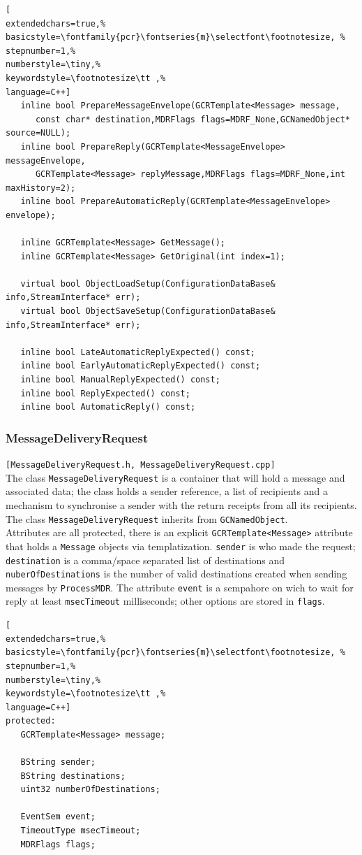 \begin{lstlisting}[
extendedchars=true,%
basicstyle=\fontfamily{pcr}\fontseries{m}\selectfont\footnotesize, %
stepnumber=1,%
numberstyle=\tiny,%
keywordstyle=\footnotesize\tt ,%
language=C++]
   inline bool PrepareMessageEnvelope(GCRTemplate<Message> message,
      const char* destination,MDRFlags flags=MDRF_None,GCNamedObject* source=NULL);
   inline bool PrepareReply(GCRTemplate<MessageEnvelope> messageEnvelope,
      GCRTemplate<Message> replyMessage,MDRFlags flags=MDRF_None,int maxHistory=2);
   inline bool PrepareAutomaticReply(GCRTemplate<MessageEnvelope> envelope);

   inline GCRTemplate<Message> GetMessage();
   inline GCRTemplate<Message> GetOriginal(int index=1);

   virtual bool ObjectLoadSetup(ConfigurationDataBase& info,StreamInterface* err);
   virtual bool ObjectSaveSetup(ConfigurationDataBase& info,StreamInterface* err);

   inline bool LateAutomaticReplyExpected() const;
   inline bool EarlyAutomaticReplyExpected() const;
   inline bool ManualReplyExpected() const;
   inline bool ReplyExpected() const;
   inline bool AutomaticReply() const;
\end{lstlisting}



\subsubsection{MessageDeliveryRequest}
\texttt{[MessageDeliveryRequest.h, MessageDeliveryRequest.cpp]}\\
The class \texttt{MessageDeliveryRequest} is a container that will hold a message and associated data; the class holds a sender reference, a list of recipients and a mechanism to synchronise a sender with the return receipts from all its recipients. The class \texttt{MessageDeliveryRequest} inherits from \texttt{GCNamedObject}. \\


Attributes are all protected, there is an explicit \texttt{GCRTemplate<Message>} attribute that holds a \texttt{Message} objects via templatization. \texttt{sender} is who made the request; \texttt{destination} is a comma/space separated list of destinations and \texttt{nuberOfDestinations} is the number of valid destinations created when sending messages by \texttt{ProcessMDR}. The attribute \texttt{event} is a sempahore on wich to wait for reply at least \texttt{msecTimeout} milliseconds; other options are stored in \texttt{flags}.
\begin{lstlisting}[
extendedchars=true,%
basicstyle=\fontfamily{pcr}\fontseries{m}\selectfont\footnotesize, %
stepnumber=1,%
numberstyle=\tiny,%
keywordstyle=\footnotesize\tt ,%
language=C++]
protected:
   GCRTemplate<Message> message;

   BString sender;
   BString destinations;
   uint32 numberOfDestinations;

   EventSem event;
   TimeoutType msecTimeout;
   MDRFlags flags;
\end{lstlisting}

